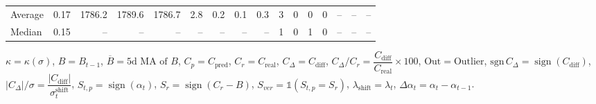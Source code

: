 \begin{threeparttable}
{\begin{tabular}{lrrrrrrrrrrrrrrr}
Average &     0.17 & 1786.2 & 1789.6 & 1786.7 &        2.8 &            0.2 &                      0.1 &                 0.3 &              3 &         0 &     0 &         0 &         -- &        -- &             -- \\
 Median &     0.15 &     -- &     -- &     -- &         -- &             -- &                       -- &                  -- &              1 &         0 &     1 &         0 &         -- &        -- &             -- \\
\bottomrule
\end{tabular}
}
\begin{tablenotes}\footnotesize
\item $\kappa=\kappa(\sigma)$, $B=B_{t-1}$, $\overline{B}=\text{5d MA of }B$, $C_p=C_{\text{pred}}$, $C_r=C_{\text{real}}$, $C_\Delta=C_{\text{diff}}$, $C_\Delta/C_r=\dfrac{C_{\text{diff}}}{C_{\text{real}}}\times100$, $\mathrm{Out}=\text{Outlier}$, $\mathrm{sgn}\,C_\Delta=\operatorname{sign}(C_{\text{diff}})$, $|C_\Delta|/\sigma=\dfrac{|C_{\text{diff}}|}{\sigma_t^{\text{shift}}}$, $S_{t,p}=\operatorname{sign}(\alpha_t)$, $S_r=\operatorname{sign}(C_r - B)$, $S_{ver}=\mathbb{1}(S_{t,p}=S_r)$, $\lambda_{\text{shift}}=\lambda_t$, $\Delta\alpha_t=\alpha_t-\alpha_{t-1}$.\end{tablenotes}
\end{threeparttable}
\endgroup

